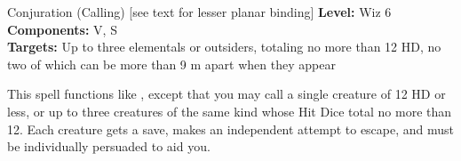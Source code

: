 {Conjuration (Calling) [see text for lesser planar binding]}
{
	\textbf{Level:}
	Wiz 6\\
	\textbf{Components:}
	V, S\\
	\textbf{Targets:}
	Up to three elementals or outsiders, totaling no more than 12 HD, no two of which can be more than 9 m apart when they appear\\
}
{
	This spell functions like , except that you may call a single creature of 12 HD or less, or up to three creatures of the same kind whose Hit Dice total no more than 12. Each creature gets a save, makes an independent attempt to escape, and must be individually persuaded to aid you.

}
